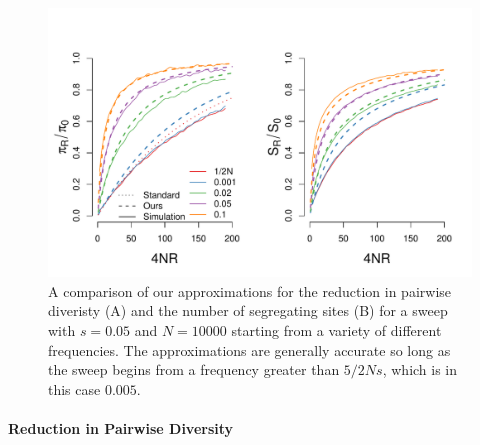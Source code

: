 \documentclass[a4paper,10pt]{article}
\begin{document}
\begin{figure}
	\includegraphics[width = \textwidth]{../Paper_Figures/pi_and_S_density.pdf} 
	\caption{A comparison of our approximations for the reduction in pairwise diveristy (A) and the number of segregating sites (B) for a sweep with $s=0.05$ and $N=10000$ starting from a variety of different frequencies. The approximations are generally accurate so long as the sweep begins from a frequency greater than $5/2Ns$, which is in this case $0.005$.} \label{pi_plot}
\end{figure}


\paragraph{Reduction in Pairwise Diversity}
\end{document}

